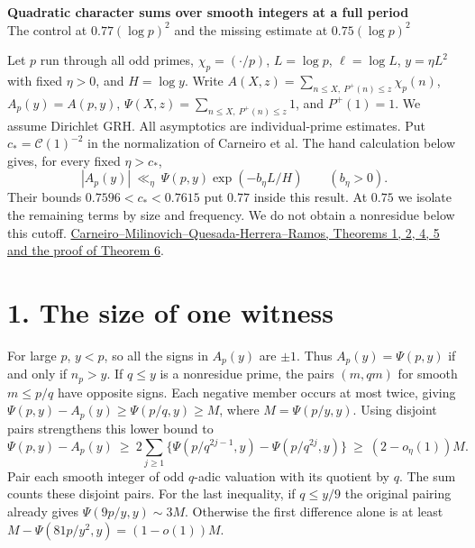\documentclass[11pt]{article}
\newcommand{\ch}{\chi_p}
\newcommand{\CM}{\href{https://arxiv.org/pdf/2404.08380v2}{Carneiro--Milinovich--Quesada-Herrera--Ramos, Theorems 1, 2, 4, 5 and the proof of Theorem 6}}
\begin{document}
{\Large\bfseries Quadratic character sums over smooth integers at a full period}\\[3pt]
{\large The control at \(0.77(\log p)^2\) and the missing estimate at \(0.75(\log p)^2\)}

Let \(p\) run through all odd primes, \(\ch=(\cdot/p)\), \(L=\log p\),
\(\ell=\log L\), \(y=\eta L^2\) with fixed \(\eta>0\), and \(H=\log y\).
Write \(A(X,z)=\sum_{n\le X,\ P^+(n)\le z}\ch(n)\), \(A_p(y)=A(p,y)\),
\(\Psi(X,z)=\sum_{n\le X,\ P^+(n)\le z}1\), and \(P^+(1)=1\).
We assume Dirichlet GRH. All asymptotics are individual-prime estimates.
Put \(c_*=\mathcal C(1)^{-2}\) in the normalization of Carneiro et al.
The hand calculation below gives, for every fixed \(\eta>c_*\),
\begin{equation}
  |A_p(y)|\ \ll_\eta\ \Psi(p,y)\exp(-b_\eta L/H)
  \qquad (b_\eta>0).
\end{equation}
Their bounds \(0.7596<c_*<0.7615\) put \(0.77\) inside this result.
At \(0.75\) we isolate the remaining terms by size and frequency. We do
not obtain a nonresidue below this cutoff. \CM.

\section*{1. The size of one witness}
For large \(p\), \(y<p\), so all the signs in \(A_p(y)\) are \(\pm1\).
Thus \(A_p(y)=\Psi(p,y)\) if and only if \(n_p>y\). If \(q\le y\) is a
nonresidue prime, the pairs \((m,qm)\) for smooth \(m\le p/q\) have
opposite signs. Each negative member occurs at most twice, giving
\(\Psi(p,y)-A_p(y)\ge\Psi(p/q,y)\ge M\), where \(M=\Psi(p/y,y)\).
Using disjoint pairs strengthens this lower bound to
\begin{equation}
 \Psi(p,y)-A_p(y)\ \ge\
 2\sum_{j\ge1}\{\Psi(p/q^{2j-1},y)-\Psi(p/q^{2j},y)\}
 \ \ge\ (2-o_\eta(1))M .
\end{equation}
Pair each smooth integer of odd \(q\)-adic valuation with its quotient
by \(q\). The sum counts these disjoint pairs. For the last inequality,
if \(q\le y/9\) the original pairing already gives
\(\Psi(9p/y,y)\sim3M\). Otherwise the first difference alone is at least
\(M-\Psi(81p/y^2,y)=(1-o(1))M\).
\end{document}
